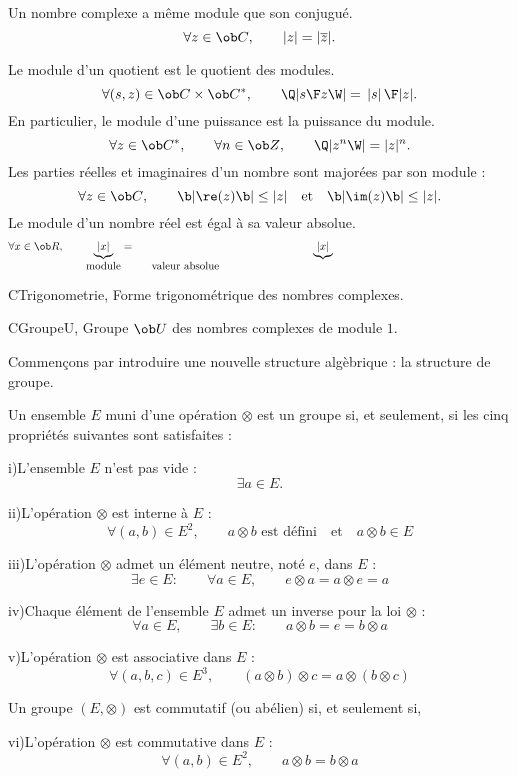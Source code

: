 \noindent
Un nombre complexe a même module que son conjugué. 
$$
{\forall z\in\ob C}, \qquad
{|z|=|\overline z|}.
$$

\noindent
Le module d'un quotient est le quotient des modules. 
$$
{\forall (s,z)\in\ob C\times \ob C^*}, \qquad
{\Q|{s\F z}\W|={\thinspace|s|\thinspace\F|z|}}.
$$
En particulier, le module d'une puissance est la puissance du module. 
$$
{\forall z\in\ob C^*}, \qquad
{\forall n\in\ob Z}, \qquad 
{\Q|z^n\W|=|z|^n}.
$$
Les parties réelles et imaginaires d'un nombre sont majorées par son module : 
$$
{
\forall z\in\ob C}, \qquad 
{\b|\re(z)\b|\le |z|}\quad\mbox{et}\quad
{\b|\im(z)\b|\le|z|}. 
$$
Le module d'un nombre réel est égal à sa valeur absolue. 
$$
\forall x\in\ob R, \qquad \underbrace{|x|}_{\mbox{module}}=\underbrace{|x|}_{\vtop{\mbox{valeur absolue}}}
$$

\Section CTrigonometrie, Forme trigonométrique des nombres complexes. 

\Subsection CGroupeU, Groupe $\ob U$ des nombres complexes de module $1$. 

Commen\c cons par introduire une nouvelle structure algèbrique : la structure de groupe. 
\medskip


\Definition [] Un ensemble $E$ muni d'une opération $\otimes$ est un groupe si, et seulement, si 
les cinq propriétés suivantes sont satisfaites : 
\item{i)}L'ensemble $E$ n'est pas vide : 
$$
\exists a\in E.
$$ 
\item{ii)}L'opération $\otimes$ est interne à $E$ : 
$$
\forall (a,b)\in E^2, \qquad a\otimes b\mbox{ est défini}\quad\mbox{et}\quad a\otimes b\in E
$$
\item{iii)}L'opération $\otimes$ admet un élément neutre, noté $e$, dans $E$ : 
$$
\exists e\in E:\qquad \forall a\in E,\qquad e\otimes a=a\otimes e=a
$$
\item{iv)}Chaque élément de l'ensemble $E$ admet un inverse pour la loi $\otimes$ : 
$$
\forall a\in E, \qquad \exists b\in E:\qquad a\otimes b=e=b\otimes a
$$
\item{v)}L'opération $\otimes$ est associative dans $E$ :
$$
\forall (a,b,c)\in E^3, \qquad(a\otimes b)\otimes c=a\otimes (b\otimes c)
$$ 

\Definition [] Un groupe $(E,\otimes)$ est commutatif (ou abélien) si, et seulement si, 
\item{vi)}L'opération $\otimes$ est commutative dans $E$ : 
$$
\forall (a,b)\in E^2, \qquad a\otimes b=b\otimes a
$$
\bigskip


